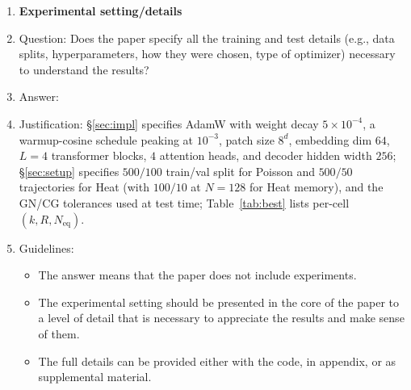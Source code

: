\begin{enumerate}
\item {\bf Experimental setting/details}
    \item[] Question: Does the paper specify all the training and test details (e.g., data splits, hyperparameters, how they were chosen, type of optimizer) necessary to understand the results?
    \item[] Answer: \answerYes{}
    \item[] Justification: \S\ref{sec:impl} specifies AdamW with weight decay $5\times 10^{-4}$, a warmup-cosine schedule peaking at $10^{-3}$, patch size $8^d$, embedding dim $64$, $L=4$ transformer blocks, $4$ attention heads, and decoder hidden width $256$; \S\ref{sec:setup} specifies $500/100$ train/val split for Poisson and $500/50$ trajectories for Heat (with $100/10$ at $N{=}128$ for Heat memory), and the GN/CG tolerances used at test time; Table~\ref{tab:best} lists per-cell $(k, R, N_\mathrm{eq})$.
    \item[] Guidelines:
    \begin{itemize}
        \item The answer \answerNA{} means that the paper does not include experiments.
        \item The experimental setting should be presented in the core of the paper to a level of detail that is necessary to appreciate the results and make sense of them.
        \item The full details can be provided either with the code, in appendix, or as supplemental material.
    \end{itemize}


\end{enumerate}
